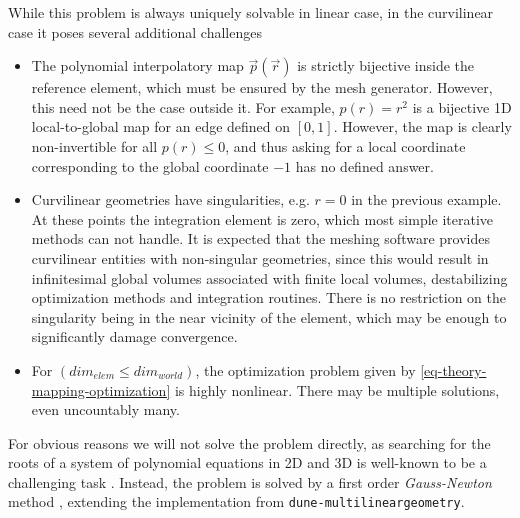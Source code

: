 \noindent
While this problem is always uniquely solvable in linear case, in the curvilinear case it poses several additional challenges
\begin{itemize}
	\item The polynomial interpolatory map $\vec{p}(\vec{r})$ is strictly bijective inside the reference element, which must be ensured by the mesh generator. However, this need not be the case outside it. For example, $p(r) = r^2$ is a bijective 1D local-to-global map for an edge defined on $[0,1]$. However, the map is clearly non-invertible for all $p(r) \leq 0$, and thus asking for a local coordinate corresponding to the global coordinate $-1$ has no defined answer.
	\item Curvilinear geometries have singularities, e.g. $r = 0$ in the previous example. At these points the integration element is zero, which most simple iterative methods can not handle. It is expected that the meshing software provides curvilinear entities with non-singular geometries, since this would result in infinitesimal global volumes associated with finite local volumes, destabilizing optimization methods and integration routines. There is no restriction on the singularity being in the near vicinity of the element, which may be enough to significantly damage convergence.
	\item For $(dim_{elem} \leq dim_{world})$, the optimization problem given by \cref{eq-theory-mapping-optimization} is highly nonlinear. There may be multiple solutions, even uncountably many.
\end{itemize}

\noindent
For obvious reasons we will not solve the problem directly, as searching for the roots of a system of polynomial equations in 2D and 3D is well-known to be a challenging task \cite{canny+1989}. Instead, the problem is solved by a first order \textit{Gauss-Newton} method \cite{bjoerck+1996}, extending the implementation from \texttt{dune-multilineargeometry}. \\

